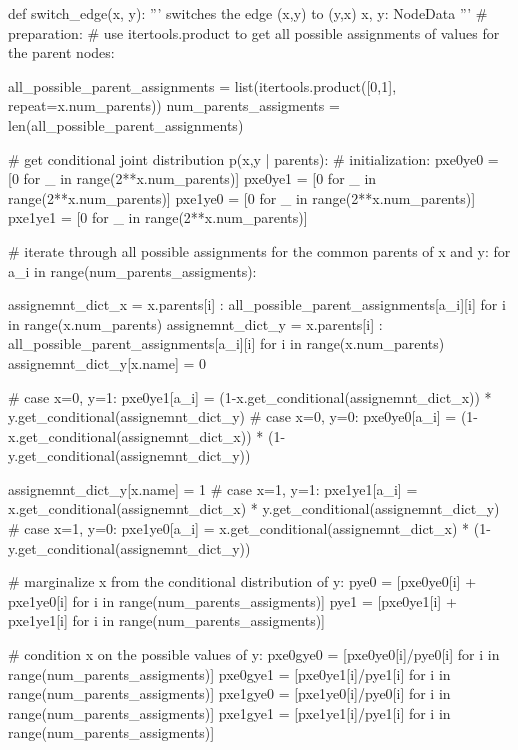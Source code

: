 \begin{python}
def switch_edge(x, y):
    '''
    switches the edge (x,y) to (y,x)
    x, y: NodeData
    '''
    # preparation:
    # use itertools.product to get all possible assignments of values for the parent nodes:
    
    all_possible_parent_assignments = list(itertools.product([0,1], repeat=x.num_parents))
    num_parents_assigments = len(all_possible_parent_assignments)

    # get conditional joint distribution p(x,y | parents):
    # initialization:
    pxe0ye0 = [0 for _ in range(2**x.num_parents)]  
    pxe0ye1 = [0 for _ in range(2**x.num_parents)]
    pxe1ye0 = [0 for _ in range(2**x.num_parents)]
    pxe1ye1 = [0 for _ in range(2**x.num_parents)]
    
    
    # iterate through all possible assignments for the common parents of x and y:
    for a_i in range(num_parents_assigments):
        
        assignemnt_dict_x = {x.parents[i] : all_possible_parent_assignments[a_i][i] for i in range(x.num_parents)}
        assignemnt_dict_y = {x.parents[i] : all_possible_parent_assignments[a_i][i] for i in range(x.num_parents)}
        assignemnt_dict_y[x.name] = 0
        
        # case x=0, y=1:
        pxe0ye1[a_i] = (1-x.get_conditional(assignemnt_dict_x)) 
        		* y.get_conditional(assignemnt_dict_y)
        # case x=0, y=0:
        pxe0ye0[a_i] = (1-x.get_conditional(assignemnt_dict_x)) 
        		* (1-y.get_conditional(assignemnt_dict_y))

        assignemnt_dict_y[x.name] = 1
        # case x=1, y=1:
        pxe1ye1[a_i] = x.get_conditional(assignemnt_dict_x) 
        		* y.get_conditional(assignemnt_dict_y)
        # case x=1, y=0:
        pxe1ye0[a_i] = x.get_conditional(assignemnt_dict_x) 
        		* (1-y.get_conditional(assignemnt_dict_y))

    
    # marginalize x from the conditional distribution of y:
    pye0 = [pxe0ye0[i] + pxe1ye0[i] for i in range(num_parents_assigments)]
    pye1 = [pxe0ye1[i] + pxe1ye1[i] for i in range(num_parents_assigments)]

    # condition x on the possible values of y:
    pxe0gye0 = [pxe0ye0[i]/pye0[i] for i in range(num_parents_assigments)]
    pxe0gye1 = [pxe0ye1[i]/pye1[i] for i in range(num_parents_assigments)]
    pxe1gye0 = [pxe1ye0[i]/pye0[i] for i in range(num_parents_assigments)]
    pxe1gye1 = [pxe1ye1[i]/pye1[i] for i in range(num_parents_assigments)]


\end{python}
